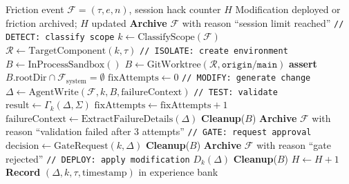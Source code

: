 \documentclass[11pt]{article}
\begin{document}
\begin{algorithm}[H]
\caption{HARNESS-HACK: Safe Agent Self-Modification}
\label{alg:hhp}
\begin{algorithmic}[1]
\Require Friction event $\mathcal{F} = (\tau, e, n)$, session hack counter $H$
\Ensure Modification deployed or friction archived; $H$ updated
    \State \textbf{Archive} $\mathcal{F}$ with reason ``session limit reached''
    \State \Return {}
\EndIf
\State \texttt{// DETECT: classify scope}
\State $k \gets \text{ClassifyScope}(\mathcal{F})$ 
\State $\mathcal{R} \gets \text{TargetComponent}(k, \tau)$
\State \texttt{// ISOLATE: create environment}
    \State $B \gets \text{InProcessSandbox}()$
\Else
    \State $B \gets \text{GitWorktree}(\mathcal{R}, \texttt{origin/main})$
    \State \textbf{assert} $B.\text{rootDir} \cap \mathcal{F}_{\text{system}} = \emptyset$
\EndIf
\State $\text{fixAttempts} \gets 0$
\Repeat {}
    \State \texttt{// MODIFY: generate change}
    \State $\Delta \gets \text{AgentWrite}(\mathcal{F}, k, B, \text{failureContext})$
    \State \texttt{// TEST: validate}
    \State $\text{result} \gets \Gamma_k(\Delta, \Sigma)$
    \State $\text{fixAttempts} \gets \text{fixAttempts} + 1$
        \State $\text{failureContext} \gets \text{ExtractFailureDetails}(\Delta)$
    \EndIf
{}
    \State \textbf{Cleanup}($B$) 
    \State \textbf{Archive} $\mathcal{F}$ with reason ``validation failed after 3 attempts''
    \State \Return
\EndIf
\State \texttt{// GATE: request approval}
\State $\text{decision} \gets \text{GateRequest}(k, \Delta)$
    \State \textbf{Cleanup}($B$)
    \State \textbf{Archive} $\mathcal{F}$ with reason ``gate rejected''
    \State \Return
\EndIf
\State \texttt{// DEPLOY: apply modification}
\State $D_k(\Delta)$ 
\State \textbf{Cleanup}($B$) 
\State $H \gets H + 1$
\State \textbf{Record} $(\Delta, k, \tau, \text{timestamp})$ in experience bank
\end{algorithmic}
\end{algorithm}
\end{document}
